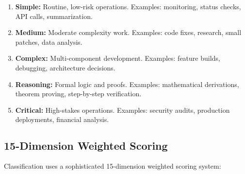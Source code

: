 \documentclass{article}
\begin{document}
\begin{enumerate}[leftmargin=*]
    \item \textbf{Simple:} Routine, low-risk operations. Examples: monitoring, status checks, API calls, summarization.
    
    \item \textbf{Medium:} Moderate complexity work. Examples: code fixes, research, small patches, data analysis.
    
    \item \textbf{Complex:} Multi-component development. Examples: feature builds, debugging, architecture decisions.
    
    \item \textbf{Reasoning:} Formal logic and proofs. Examples: mathematical derivations, theorem proving, step-by-step verification.
    
    \item \textbf{Critical:} High-stakes operations. Examples: security audits, production deployments, financial analysis.
\end{enumerate}

\subsection{15-Dimension Weighted Scoring}

Classification uses a sophisticated 15-dimension weighted scoring system:
\end{document}
